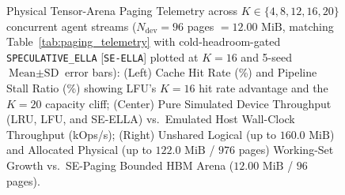 \documentclass[conference,10pt]{IEEEtran}
\begin{document}
\begin{figure}[t]
\begin{minipage}[t]{0.32\textwidth}
\end{minipage}
\caption{Physical Tensor-Arena Paging Telemetry across $K \in \{4, 8, 12, 16, 20\}$ concurrent agent streams ($N_{\text{dev}}=96$ pages $= 12.00\text{ MiB}$, matching Table~\ref{tab:paging_telemetry} with cold-headroom-gated \texttt{SPECULATIVE\_ELLA} [\texttt{SE-ELLA}] plotted at $K=16$ and 5-seed $\text{Mean} \pm \text{SD}$ error bars): (Left) Cache Hit Rate (\%) and Pipeline Stall Ratio (\%) showing LFU's $K=16$ hit rate advantage and the $K=20$ capacity cliff; (Center) Pure Simulated Device Throughput (LRU, LFU, and SE-ELLA) vs.\ Emulated Host Wall-Clock Throughput (kOps/s); (Right) Unshared Logical (up to $160.0\text{ MiB}$) and Allocated Physical (up to $122.0\text{ MiB}$ / $976$ pages) Working-Set Growth vs.\ SE-Paging Bounded HBM Arena ($12.00\text{ MiB}$ / $96$ pages).}
\label{fig:paging_plots}
\end{figure}
\end{document}
